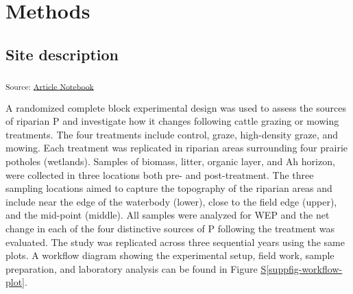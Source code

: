 \documentclass[
]{agujournal2019}
\newcommand*\quartosuppfigref[1]{Figure \hyperref[#1]{S\ref{#1}}}
\begin{document}
\section{Methods}\label{methods}

\subsection{Site description}\label{site-description}

\textsubscript{Source:
\href{https://alex-koiter.github.io/riparian-grazing-manuscript/index.qmd.html}{Article
Notebook}}

A randomized complete block experimental design was used to assess the
sources of riparian P and investigate how it changes following cattle
grazing or mowing treatments. The four treatments include control,
graze, high-density graze, and mowing. Each treatment was replicated in
riparian areas surrounding four prairie potholes (wetlands). Samples of
biomass, litter, organic layer, and Ah horizon, were collected in three
locations both pre- and post-treatment. The three sampling locations
aimed to capture the topography of the riparian areas and include near
the edge of the waterbody (lower), close to the field edge (upper), and
the mid-point (middle). All samples were analyzed for WEP and the net
change in each of the four distinctive sources of P following the
treatment was evaluated. The study was replicated across three
sequential years using the same plots. A workflow diagram showing the
experimental setup, field work, sample preparation, and laboratory
analysis can be found in \quartosuppfigref{suppfig-workflow-plot}.
\end{document}
